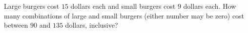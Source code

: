 Large burgers cost $15$ dollars each and small burgers cost $9$ dollars each. How many combinations of large and small burgers (either number may be zero) cost between $90$ and $135$ dollars, inclusive?
